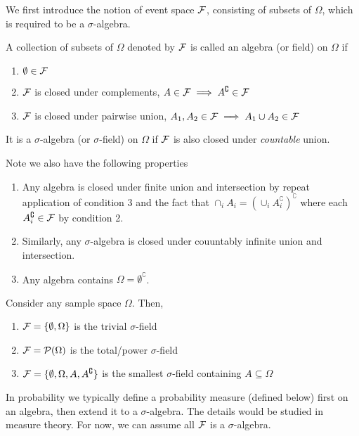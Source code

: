\documentclass[11pt]{article}
\begin{document}
We first introduce the notion of event space \(\cal{F}\), consisting of subsets of \(\Omega\), which is required to be a \(\sigma\)-algebra.
\begin{definition}
  A collection of subsets of \(\Omega\) denoted by \(\cal{F}\) is called an algebra (or field) on \(\Omega\) if
  \begin{enumerate}
    \item \(\emptyset\in\cal{F}\)
    \item \(\cal{F}\) is closed under complements, \(A\in\cal{F}\implies A^\complement\in\cal{F}\)
    \item \(\cal{F}\) is closed under pairwise union, \(A_1,A_2\in\cal{F}\implies A_1\cup A_2\in\cal{F}\)
  \end{enumerate}
  It is a \(\sigma\)-algebra (or \(\sigma\)-field) on \(\Omega\) if \(\cal{F}\) is also closed under \emph{countable} union.
\end{definition}
\begin{remark}
  Note we also have the following properties
  \begin{enumerate}
    \item Any algebra is closed under finite union and intersection by repeat application of condition 3 and the fact that \(\cap_iA_i=(\cup_iA_i^\complement)^\complement\) where each \(A_i^\complement\in\cal{F}\) by condition 2.
    \item Similarly, any \(\sigma\)-algebra is closed under couuntably infinite union and intersection.
    \item Any algebra contains \(\Omega=\emptyset^\complement\).
  \end{enumerate}
\end{remark}
\begin{example}
  Consider any sample space \(\Omega\). Then,
  \begin{enumerate}
    \item \(\cal{F}=\{\emptyset,\Omega\}\) is the trivial \(\sigma\)-field
    \item \(\cal{F}=\cal{P}(\Omega)\) is the total/power \(\sigma\)-field
    \item \(\cal{F}=\{\emptyset,\Omega,A,A^\complement\}\) is the smallest \(\sigma\)-field containing \(A\subseteq\Omega\)
  \end{enumerate}
\end{example}
In probability we typically define a probability measure (defined below) first on an algebra, then extend it to a \(\sigma\)-algebra. The details would be studied in measure theory. For now, we can assume all \(\cal{F}\) is a \(\sigma\)-algebra.
\end{document}
